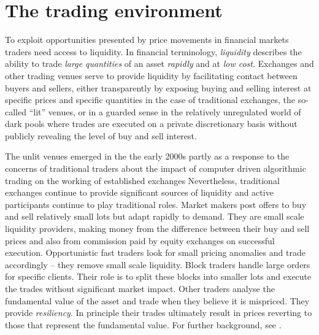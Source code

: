 \section{The trading environment}
To exploit opportunities presented by price movements in financial markets traders  need access to liquidity. In financial terminology, {\it liquidity} describes the ability to trade {\it large quantities} of an asset {\it rapidly} and at {\it low cost}. Exchanges and other trading venues serve to provide liquidity by facilitating contact between buyers and sellers, either transparently by exposing buying and selling interest at specific prices and specific quantities in the case of traditional exchanges, the so-called ``lit'' venues, or in a guarded sense in the relatively unregulated world of dark pools where trades are executed on a private discretionary basis without publicly revealing the level of buy and sell interest. 

The unlit venues emerged in the the early 2000s partly as a response to the concerns of traditional traders about the impact of computer driven algorithmic trading on the working of established exchanges  Nevertheless, traditional exchanges continue to provide significant sources of liquidity and active participants continue to play traditional roles. Market makers post offers to buy and sell relatively small lots but adapt rapidly to demand. They are small scale liquidity providers, making money from the difference between their buy and sell prices and also from commission paid by equity exchanges on successful execution. Opportunistic fast traders look for small pricing anomalies and trade accordingly -- they remove small scale liquidity. Block traders handle large orders for specific clients. Their role is to split these blocks into smaller lots and execute the trades without significant market impact. Other traders analyse the fundamental value of the asset and trade when they believe it is mispriced. They provide {\it resiliency}. In principle their trades ultimately result in prices reverting to those that represent the fundamental value. For further background, see 
.

